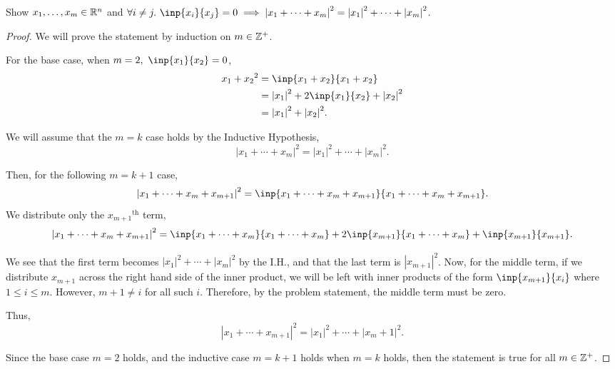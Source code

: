 \documentclass{article}
\begin{document}
\begin{problem}
Show $x_1,\ldots,x_m\in \mathbb{R}^n$ and $\forall i\neq j.\  \inp{x_{i}}{x_{j}}=0  \implies {|x_1+\cdots+x_{m}|}^2={|x_1|}^2+\cdots+{|x_m|}^2$.
\end{problem}
\begin{proof}
	We will prove the statement by induction on $m\in \mathbb{Z}^+$.

	For the base case, when $m=2,\ \inp{x_1}{x_2}=0$,
	\begin{align*}
		{x_1+x_2}^2 & = \inp{x_1+x_2}{x_1+x_2}              \\
		            & = {|x_1|}^2+2\inp{x_1}{x_2}+{|x_2|}^2 \\
		            & = {|x_1|}^2+{|x_2|}^2
		.\end{align*}

	We will assume that the $m=k$ case holds by the Inductive Hypothesis,  \[
		{|x_1+\cdots+x_{m}|}^2={|x_1|}^2+\cdots+{|x_m|}^2
		.\]

	Then, for the following $m=k+1$ case, \[
		{|x_1+\cdots+x_{m}+x_{m+1}|}^2 = \inp{x_1+\cdots+x_{m}+x_{m+1 }}{x_1+\cdots+x_{m}+x_{m+1}}
		.\]
	We distribute only the ${x_{m+1}}^{\text{th}}$ term, \[
		{|x_1+\cdots+x_{m}+x_{m+1}|}^2 = \inp{x_1+\cdots+x_{m}}{x_1+\cdots+x_{m}}+2\inp{x_{m+1}}{x_1+\cdots+x_{m}}+\inp{x_{m+1}}{x_{m+1}}
		.\]

	We see that the first term becomes ${|x_1|}^2+\cdots+{|x_{m}|}^2$ by the I.H., and that the last term is ${|x_{m+1}|}^2$.
	Now, for the middle term, if we distribute $x_{m+1}$ across the right hand side of the inner product, we will be left with inner products of the form $\inp{x_{m+1}}{x_{i}}$ where $1\le i \le m$.
	However, $m+1\neq i$ for all such $i$.
	Therefore, by the problem statement, the middle term must be zero.

	Thus, \[
		{|x_1+\cdots+x_{m+1}|}^2={|x_1|}^2+\cdots+{|x_m+1|}^2
		.\]

	Since the base case $m=2$ holds, and the inductive case  $m=k+1$ holds when  $m=k$ holds, then the statement is true for all  $m\in \mathbb{Z}^+$.

\end{proof}
\end{document}
